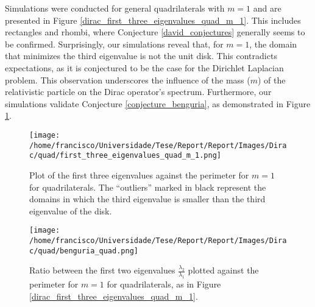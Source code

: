 \documentclass[5p,authoryear]{elsarticle}
\begin{document}
Simulations were conducted for general quadrilaterals with \(m=1\) and are presented in Figure \ref{dirac_first_three_eigenvalues_quad_m_1}. This includes rectangles and rhombi, where Conjecture \ref{david_conjectures} generally seems to be confirmed. Surprisingly, our simulations reveal that, for \(m=1\), the domain that minimizes the third eigenvalue is not the unit disk. This contradicts expectations, as it is conjectured to be the case for the Dirichlet Laplacian problem. This observation underscores the influence of the mass (\(m\)) of the relativistic particle on the Dirac operator's spectrum. Furthermore, our simulations validate Conjecture \ref{conjecture_benguria}, as demonstrated in Figure \ref{dirac_benguria_quad}.
\begin{figure}[h]
    \begin{minipage}[t]{0.4\textwidth}
        \centering
        \texttt{[image: /home/francisco/Universidade/Tese/Report/Report/Images/Dirac/quad/first\_three\_eigenvalues\_quad\_m\_1.png]}
        \caption{Plot of the first three eigenvalues against the perimeter for \(m=1\) for quadrilaterals. The ``outliers'' marked in black represent the domains in which the third eigenvalue is smaller than the third eigenvalue of the disk.}
        \label{dirac_first_three_eigenvalues_quad_m_1}
    \end{minipage}
    \hfill
    \hspace{0.5cm}
    \begin{minipage}[t]{0.4\textwidth}
        \centering
        \texttt{[image: /home/francisco/Universidade/Tese/Report/Report/Images/Dirac/quad/benguria\_quad.png]}
        \captionsetup{width=0.65\linewidth} %
        \caption{Ratio between the first two eigenvalues \(\frac{\lambda_2}{\lambda_1}\) plotted against the perimeter for \(m=1\) for quadrilaterals, as in Figure \ref{dirac_first_three_eigenvalues_quad_m_1}.}
        \label{dirac_benguria_quad}
    \end{minipage}
\end{figure}
\end{document}
